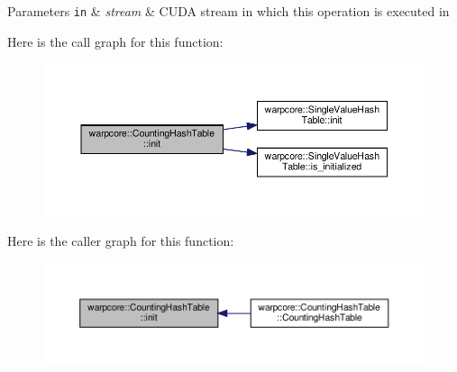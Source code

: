 \begin{DoxyParams}[1]{Parameters}
\mbox{\tt in}  & {\em stream} & C\+U\+DA stream in which this operation is executed in \\
\hline
\end{DoxyParams}
Here is the call graph for this function\+:
\nopagebreak
\begin{figure}[H]
\begin{center}
\leavevmode
\includegraphics[width=350pt]{classwarpcore_1_1CountingHashTable_aad536be8a1f0c71d3d84543423723445_cgraph}
\end{center}
\end{figure}
Here is the caller graph for this function\+:
\nopagebreak
\begin{figure}[H]
\begin{center}
\leavevmode
\includegraphics[width=350pt]{classwarpcore_1_1CountingHashTable_aad536be8a1f0c71d3d84543423723445_icgraph}
\end{center}
\end{figure}
\mbox{\label{classwarpcore_1_1CountingHashTable_a2cad25fea134d836cf1b75f67d6b38ac}} 
